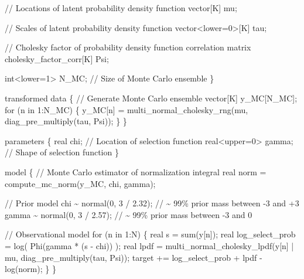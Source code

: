 \documentclass[
  letterpaper,
  DIV=11,
  numbers=noendperiod]{scrartcl}
\newenvironment{Shaded}{\begin{snugshade}}{\end{snugshade}}
\newcommand{\CommentTok}[1]{\textcolor[rgb]{0.37,0.37,0.37}{#1}}
\newcommand{\ControlFlowTok}[1]{\textcolor[rgb]{0.00,0.23,0.31}{#1}}
\newcommand{\DataTypeTok}[1]{\textcolor[rgb]{0.68,0.00,0.00}{#1}}
\newcommand{\DecValTok}[1]{\textcolor[rgb]{0.68,0.00,0.00}{#1}}
\newcommand{\FloatTok}[1]{\textcolor[rgb]{0.68,0.00,0.00}{#1}}
\newcommand{\KeywordTok}[1]{\textcolor[rgb]{0.00,0.23,0.31}{#1}}
\newcommand{\NormalTok}[1]{\textcolor[rgb]{0.00,0.23,0.31}{#1}}
\begin{document}
\begin{codelisting}
\begin{Shaded}
\begin{Highlighting}[]
  \CommentTok{// Locations of latent probability density function}
  \DataTypeTok{vector}\NormalTok{[K] mu;}

  \CommentTok{// Scales of latent probability density function}
  \DataTypeTok{vector}\NormalTok{\textless{}}\KeywordTok{lower}\NormalTok{=}\DecValTok{0}\NormalTok{\textgreater{}[K] tau;}

  \CommentTok{// Cholesky factor of probability density function correlation matrix}
  \DataTypeTok{cholesky\_factor\_corr}\NormalTok{[K] Psi;}

  \DataTypeTok{int}\NormalTok{\textless{}}\KeywordTok{lower}\NormalTok{=}\DecValTok{1}\NormalTok{\textgreater{} N\_MC; }\CommentTok{// Size of Monte Carlo ensemble}
\NormalTok{\}}

\KeywordTok{transformed data}\NormalTok{ \{}
  \CommentTok{// Generate Monte Carlo ensemble}
  \DataTypeTok{vector}\NormalTok{[K] y\_MC[N\_MC];}
  \ControlFlowTok{for}\NormalTok{ (n }\ControlFlowTok{in} \DecValTok{1}\NormalTok{:N\_MC) \{}
\NormalTok{    y\_MC[n] = multi\_normal\_cholesky\_rng(mu, diag\_pre\_multiply(tau, Psi));}
\NormalTok{  \}}
\NormalTok{\}}

\KeywordTok{parameters}\NormalTok{ \{}
  \DataTypeTok{real}\NormalTok{ chi;            }\CommentTok{// Location of selection function}
  \DataTypeTok{real}\NormalTok{\textless{}}\KeywordTok{upper}\NormalTok{=}\DecValTok{0}\NormalTok{\textgreater{} gamma; }\CommentTok{// Shape of selection function}
\NormalTok{\}}

\KeywordTok{model}\NormalTok{ \{}
  \CommentTok{// Monte Carlo estimator of normalization integral}
  \DataTypeTok{real}\NormalTok{ norm = compute\_mc\_norm(y\_MC, chi, gamma);}
  
  \CommentTok{// Prior model}
\NormalTok{  chi \textasciitilde{} normal(}\DecValTok{0}\NormalTok{, }\DecValTok{3}\NormalTok{ / }\FloatTok{2.32}\NormalTok{);   }\CommentTok{// \textasciitilde{} 99\% prior mass between {-}3 and +3}
\NormalTok{  gamma \textasciitilde{} normal(}\DecValTok{0}\NormalTok{, }\DecValTok{3}\NormalTok{ / }\FloatTok{2.57}\NormalTok{); }\CommentTok{// \textasciitilde{} 99\% prior mass between {-}3 and  0}
  
  \CommentTok{// Observational model}
  \ControlFlowTok{for}\NormalTok{ (n }\ControlFlowTok{in} \DecValTok{1}\NormalTok{:N) \{}
    \DataTypeTok{real}\NormalTok{ s = sum(y[n]);}
    \DataTypeTok{real}\NormalTok{ log\_select\_prob = log( Phi(gamma * (s {-} chi)) );}
    \DataTypeTok{real}\NormalTok{ lpdf =}
\NormalTok{      multi\_normal\_cholesky\_lpdf(y[n] | mu, diag\_pre\_multiply(tau, Psi));}
    \KeywordTok{target +=}\NormalTok{ log\_select\_prob + lpdf {-} log(norm);}
\NormalTok{  \}}
\NormalTok{\}}


\end{Highlighting}
\end{Shaded}
\end{codelisting}
\end{document}
